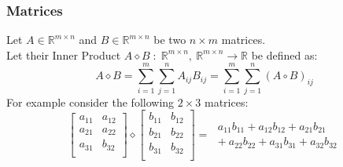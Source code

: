 \documentclass[12pt]{article}
\begin{document}
\subsubsection{Matrices}
Let \(A\in \mathbb{R}^{m \times n}\) and \(B\in \mathbb{R}^{m \times n}\) be two \(n \times m\) matrices. \\Let their Inner Product \(A\diamond B\;:\; \mathbb{R}^{m \times n},~\mathbb{R}^{m \times n} \to \mathbb{R}\) be defined as:
\begin{equation} \label{eq:defs:Inner_product}
A \diamond B = \sum_{i=1}^{m}\sum_{j=1}^{n} A_{ij}B_{ij} = \sum_{i=1}^{m}\sum_{j=1}^{n} (A \circ B)_{ij}
\end{equation}
For example consider the following \(2 \times 3\) matrices:
\[
\begin{bmatrix}
a_{11} & a_{12} \\
a_{21} & a_{22} \\
a_{31} & b_{32} \\
\end{bmatrix}
\diamond
\begin{bmatrix}
b_{11} & b_{12} \\
b_{21} & b_{22} \\
b_{31} & b_{32} \\
\end{bmatrix}
= \;
\begin{array}{ll}
     a_{11}b_{11} + a_{12}b_{12} + a_{21}b_{21}\\
+~a_{22}b_{22} + a_{31}b_{31} + a_{32}b_{32} 
\end{array}
\]
\end{document}
